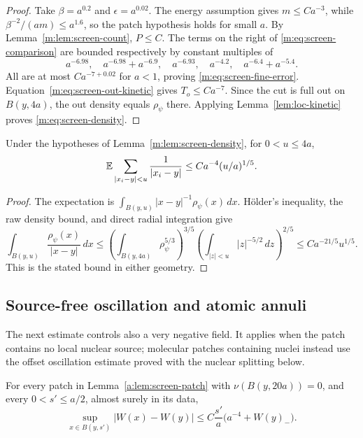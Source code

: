 \begin{proof}
Take $\beta=a^{0.2}$ and $\epsilon=a^{0.02}$.  The energy assumption
gives $m\le Ca^{-3}$, while
$\beta^{-2}/(am)\le a^{1.6}$, so the patch hypothesis holds for
small $a$.  By Lemma~\ref{m:lem:screen-count}, $P\le C$.
The terms on the right of \eqref{m:eq:screen-comparison} are bounded
respectively by constant multiples of
\[
 a^{-6.98},\quad a^{-6.98}+a^{-6.9},\quad
 a^{-6.93},\quad a^{-4.2},\quad a^{-6.4}+a^{-5.4}.
\]
All are at most $Ca^{-7+0.02}$ for $a<1$, proving
\eqref{m:eq:screen-fine-error}.  Equation~\eqref{m:eq:screen-out-kinetic}
gives $T_o\le Ca^{-7}$.  Since the cut is full out on $B(y,4a)$,
the out density equals $\rho_\psi$ there.  Applying
Lemma~\ref{lem:loc-kinetic} proves \eqref{m:eq:screen-density}.
\end{proof}

\begin{corollary}
Under the hypotheses of Lemma~\ref{m:lem:screen-density}, for
$0<u\le4a$,
\begin{equation}\label{a:eq:screen-near-coulomb}
 \mathbb E\sum_{|x_i-y|<u}\frac1{|x_i-y|}
       \le Ca^{-4}(u/a)^{1/5}.
\end{equation}
\end{corollary}

\begin{proof}
The expectation is $\int_{B(y,u)}|x-y|^{-1}\rho_\psi(x)\,dx$.
H\"older's inequality, the raw density bound, and direct radial
integration give
\[
 \int_{B(y,u)}\frac{\rho_\psi(x)}{|x-y|}\,dx
 \le\left(\int_{B(y,4a)}\rho_\psi^{5/3}\right)^{3/5}
       \left(\int_{|z|<u}|z|^{-5/2}\,dz\right)^{2/5}
 \le Ca^{-21/5}u^{1/5}.
\]
This is the stated bound in either geometry.
\end{proof}

\subsection{Source-free oscillation and atomic annuli}

The next estimate controls also a very negative field.  It applies
when the patch contains no local nuclear source; molecular patches
containing nuclei instead use the offset oscillation estimate proved
with the nuclear splitting below.

\begin{lemma}
\label{a:lem:screen-oscillation}
For every patch in Lemma~\ref{a:lem:screen-patch} with
$\nu(B(y,20a))=0$, and every
$0<s'\le a/2$, almost surely in its data,
\begin{equation}\label{a:eq:screen-oscillation}
 \sup_{x\in B(y,s')}|W(x)-W(y)|
       \le C\frac{s'}a\bigl(a^{-4}+W(y)_-\bigr).
\end{equation}
\end{lemma}

